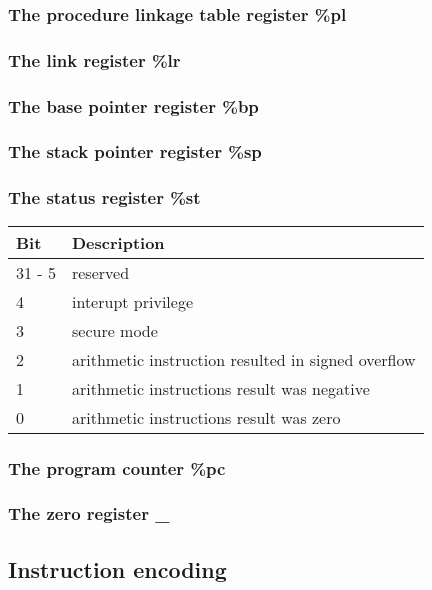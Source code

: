 \subsubsection{The procedure linkage table register \%pl}
\subsubsection{The link register \%lr}
\subsubsection{The base pointer register \%bp}
\subsubsection{The stack pointer register \%sp}

\subsubsection{The status register \%st}
\begin{center}
  \begin{tabular}{l|l}
    Bit    & Description \\
    \hline
    31 - 5 & reserved \\
    4      & interupt privilege \\
    3      & secure mode \\
    2      & arithmetic instruction resulted in signed overflow \\
    1      & arithmetic instructions result was negative \\
    0      & arithmetic instructions result was zero \\
  \end{tabular}
\end{center}

\subsubsection{The program counter \%pc}
\subsubsection{The zero register \_}

\subsection{Instruction encoding}

